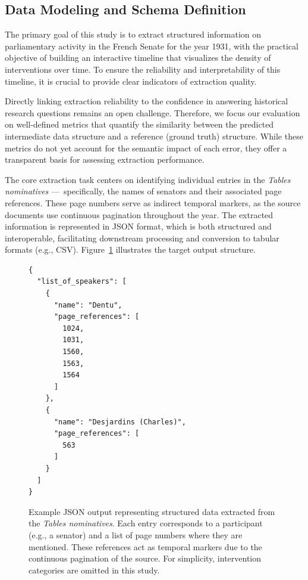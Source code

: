 \subsection{Data Modeling and Schema Definition}
\label{sec:approach-datamodel}

The primary goal of this study is to extract structured information on parliamentary activity in the French Senate for the year 1931, with the practical objective of building an interactive timeline that visualizes the density of interventions over time. To ensure the reliability and interpretability of this timeline, it is crucial to provide clear indicators of extraction quality.

Directly linking extraction reliability to the confidence in answering historical research questions remains an open challenge. Therefore, we focus our evaluation on well-defined metrics that quantify the similarity between the predicted intermediate data structure and a reference (ground truth) structure. While these metrics do not yet account for the semantic impact of each error, they offer a transparent basis for assessing extraction performance.

The core extraction task centers on identifying individual entries in the \textit{Tables nominatives} ---~specifically, the names of senators and their associated page references. These page numbers serve as indirect temporal markers, as the source documents use continuous pagination throughout the year. The extracted information is represented in JSON format, which is both structured and interoperable, facilitating downstream processing and conversion to tabular formats (e.g., CSV). Figure~\ref{fig:json_struct} illustrates the target output structure.

\begin{figure}[tb!]
\centering
\small
\begin{verbatim}
{
  "list_of_speakers": [
    {
      "name": "Dentu",
      "page_references": [
        1024,
        1031,
        1560,
        1563,
        1564
      ]
    },
    {
      "name": "Desjardins (Charles)",
      "page_references": [
        563
      ]
    }
  ]
}
\end{verbatim}
\caption{Example JSON output representing structured data extracted from the \textit{Tables nominatives}. Each entry corresponds to a participant (e.g., a senator) and a list of page numbers where they are mentioned. These references act as temporal markers due to the continuous pagination of the source. For simplicity, intervention categories are omitted in this study. %
}
\label{fig:json_struct}
\end{figure}

